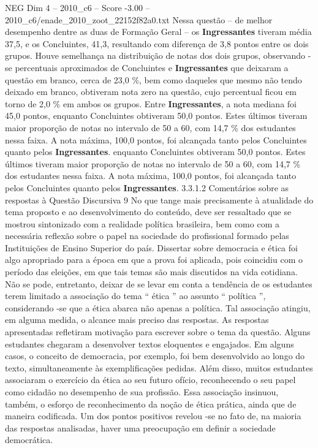 \begin{textsample}{NEG Dim 4 – 2010\_c6 – Score -3.00 – 2010\_c6/enade\_2010\_zoot\_22152f82a0.txt}
Nessa questão – de melhor desempenho dentre as duas de Formação Geral – os \textbf{Ingressantes} tiveram média 37,5, e os Concluintes, 41,3, resultando com diferença de 3,8 pontos entre os dois grupos.
Houve semelhança na distribuição de notas dos dois grupos, observando -se percentuais aproximados de Concluintes e \textbf{Ingressantes} que deixaram a questão em branco, cerca de 23,0 \%, bem como daqueles que mesmo não tendo deixado em branco, obtiveram nota zero na questão, cujo percentual ficou em torno de 2,0 \% em ambos os grupos.
Entre \textbf{Ingressantes}, a nota mediana foi 45,0 pontos, enquanto Concluintes obtiveram 50,0 pontos.
Estes últimos tiveram maior proporção de notas no intervalo de 50 a 60, com 14,7 \% dos estudantes nessa faixa.
A nota máxima, 100,0 pontos, foi alcançada tanto pelos Concluintes quanto pelos \textbf{Ingressantes}. enquanto Concluintes obtiveram 50,0 pontos.
Estes últimos tiveram maior proporção de notas no intervalo de 50 a 60, com 14,7 \% dos estudantes nessa faixa.
A nota máxima, 100,0 pontos, foi alcançada tanto pelos Concluintes quanto pelos \textbf{Ingressantes}. 3.3.1.2 Comentários sobre as respostas à Questão Discursiva 9 No que tange mais precisamente à atualidade do tema proposto e ao desenvolvimento do conteúdo, deve ser ressaltado que se mostrou sintonizado com a realidade política brasileira, bem como com a necessária reflexão sobre o papel na sociedade do profissional formado pelas Instituições de Ensino Superior do país.
Dissertar sobre democracia e ética foi algo apropriado para a época em que a prova foi aplicada, pois coincidiu com o período das eleições, em que tais temas são mais discutidos na vida cotidiana.
Não se pode, entretanto, deixar de se levar em conta a tendência de os estudantes terem limitado a associação do tema “ ética ” ao assunto “ política ”, considerando -se que a ética abarca não apenas a política.
Tal associação atingiu, em alguma medida, o alcance mais preciso das respostas.
As respostas apresentadas refletiram motivação para escrever sobre o tema da questão.
Alguns estudantes chegaram a desenvolver textos eloquentes e engajados.
Em alguns casos, o conceito de democracia, por exemplo, foi bem desenvolvido ao longo do texto, simultaneamente às exemplificações pedidas.
Além disso, muitos estudantes associaram o exercício da ética ao seu futuro ofício, reconhecendo o seu papel como cidadão no desempenho de sua profissão.
Essa associação insinuou, também, o esforço de reconhecimento da noção de ética prática, ainda que de maneira codificada.
Um dos pontos positivos revelou -se no fato de, na maioria das respostas analisadas, haver uma preocupação em definir a sociedade democrática.

\end{textsample}
